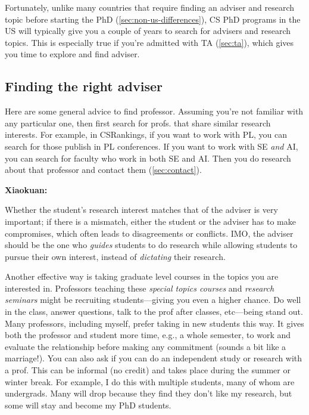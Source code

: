 \documentclass[oneside,11pt]{book}
\newenvironment{commentbox}[1][]{
  \small
  \begin{mybox}
    {\small \textbf{#1}}
  }{
  \end{mybox}
}
\begin{document}
Fortunately, unlike many countries that require finding an adviser and research topic before starting the PhD (\autoref{sec:non-us-differences}), CS PhD programs in the US will typically give you a couple of years to search for advisers and research topics.  This is especially true if you're admitted with TA (\autoref{sec:ta}), which gives you time to explore and find adviser.

\subsection{Finding the right adviser}

Here are some general advice to find professor.  Assuming you're not familiar with any particular one, then first search for profs. that share similar research interests.  For example, in CSRankings, if you want to work with PL, you can search for those publish in PL conferences.  If you want to work with SE \emph{and} AI, you can search for faculty who work in both SE and AI.  Then you do research about that professor and contact them (\autoref{sec:contact}).

\begin{commentbox}[Xiaokuan:]
  Whether the student's research interest matches that of the adviser is very important;
  if there is a mismatch,
  either the student or the adviser has to make compromises,
  which often leads to disagreements or conflicts.
  IMO, the adviser should be the one who \emph{guides}  students to do research while allowing students to pursue their own interest,
  instead of \emph{dictating} their research.
\end{commentbox}


Another effective way is taking graduate level courses in the topics you are interested in.  Professors teaching these \emph{special topics courses} and \emph{research seminars} might be recruiting students---giving you even a higher chance. Do well in the class, answer questions, talk to the prof after classes, etc---being stand out.  Many professors, including myself, prefer taking in new students this way.  It gives both the professor and student more time, e.g., a whole semester, to work and evaluate the relationship before making any commitment (sounds a bit like a marriage!).
You can also ask if you can do an independent study or research with a prof. This can be informal (no credit) and takes place during the summer or winter break.  For example, I do this with multiple students, many of whom are undergrads. Many will drop because they find they don't like my research, but some will stay and become my PhD students.
\end{document}
